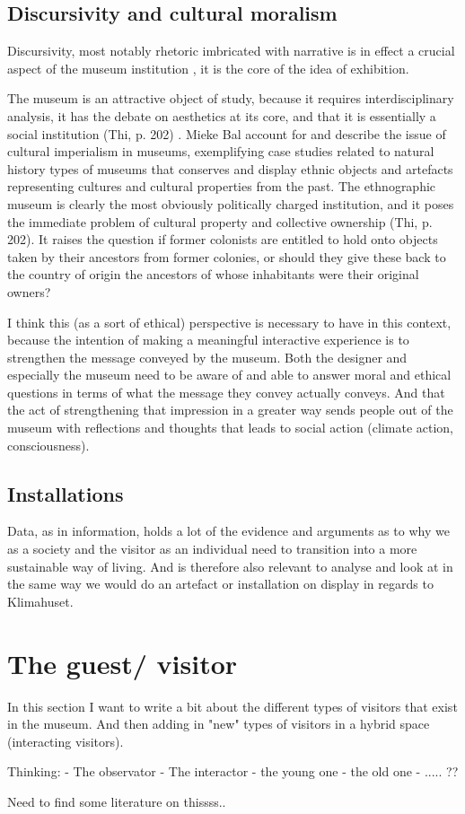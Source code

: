 \subsection{Discursivity and cultural moralism}
Discursivity, most notably rhetoric imbricated with narrative is in effect a crucial aspect of the museum institution \autocite[p. 205]{Thi_book}, it is the core of the idea of exhibition.

The museum is an attractive object of study, because it requires interdisciplinary analysis, it has the debate on aesthetics at its core, and that it is essentially a social institution (Thi, p. 202) \autocite[p. 202]{Miekebal_book}. Mieke Bal account for and describe the issue of cultural imperialism in museums, exemplifying case studies related to natural history types of museums that conserves and display ethnic objects and artefacts representing cultures and cultural properties from the past. The ethnographic museum is clearly the most obviously politically charged institution, and it poses the immediate problem of cultural property and collective ownership (Thi, p. 202). It raises the question if former colonists are entitled to hold onto objects taken by their ancestors from former colonies, or should they give these back to the country of origin the ancestors of whose inhabitants were their original owners?

I think this (as a sort of ethical) perspective is necessary to have in this context, because the intention of making a meaningful interactive experience is to strengthen the message conveyed by the museum. Both the designer and especially the museum need to be aware of and able to answer moral and ethical questions in terms of what the message they convey actually conveys. And that the act of strengthening that impression in a greater way sends people out of the museum with reflections and thoughts that leads to social action (climate action, consciousness). 




\subsection{Installations}
Data, as in information, holds a lot of the evidence and arguments as to why we as a society and the visitor as an individual need to transition into a more sustainable way of living. And is therefore also relevant to analyse and look at in the same way we would do an artefact or installation on display in regards to Klimahuset.



\section{The guest/ visitor}
In this section I want to write a bit about the different types of visitors that exist in the museum. And then adding in "new" types of visitors in a hybrid space (interacting visitors).

Thinking:
- The observator
- The interactor
- the young one
- the old one
- ..... ??

\par Need to find some literature on thissss..